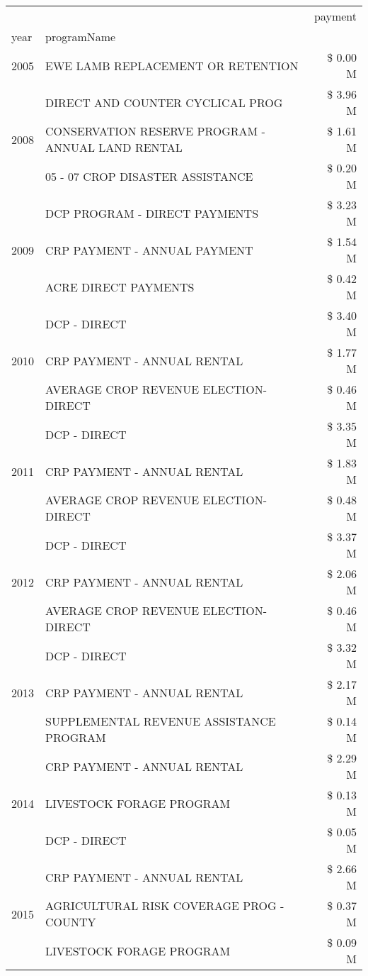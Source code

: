 \begin{tabular}{llr}
\toprule
 &  & payment \\
year & programName &  \\
\midrule
2005 & EWE LAMB REPLACEMENT OR RETENTION & \$ 0.00 M \\
\cline{1-3}
\multirow[t]{3}{*}{2008} & DIRECT AND COUNTER CYCLICAL PROG & \$ 3.96 M \\
 & CONSERVATION RESERVE PROGRAM - ANNUAL LAND RENTAL & \$ 1.61 M \\
 & 05 - 07 CROP DISASTER ASSISTANCE & \$ 0.20 M \\
\cline{1-3}
\multirow[t]{3}{*}{2009} & DCP PROGRAM - DIRECT PAYMENTS & \$ 3.23 M \\
 & CRP PAYMENT - ANNUAL PAYMENT & \$ 1.54 M \\
 & ACRE DIRECT PAYMENTS & \$ 0.42 M \\
\cline{1-3}
\multirow[t]{3}{*}{2010} & DCP - DIRECT & \$ 3.40 M \\
 & CRP PAYMENT - ANNUAL RENTAL & \$ 1.77 M \\
 & AVERAGE CROP REVENUE ELECTION-DIRECT & \$ 0.46 M \\
\cline{1-3}
\multirow[t]{3}{*}{2011} & DCP - DIRECT & \$ 3.35 M \\
 & CRP PAYMENT - ANNUAL RENTAL & \$ 1.83 M \\
 & AVERAGE CROP REVENUE ELECTION-DIRECT & \$ 0.48 M \\
\cline{1-3}
\multirow[t]{3}{*}{2012} & DCP - DIRECT & \$ 3.37 M \\
 & CRP PAYMENT - ANNUAL RENTAL & \$ 2.06 M \\
 & AVERAGE CROP REVENUE ELECTION-DIRECT & \$ 0.46 M \\
\cline{1-3}
\multirow[t]{3}{*}{2013} & DCP - DIRECT & \$ 3.32 M \\
 & CRP PAYMENT - ANNUAL RENTAL & \$ 2.17 M \\
 & SUPPLEMENTAL REVENUE ASSISTANCE PROGRAM & \$ 0.14 M \\
\cline{1-3}
\multirow[t]{3}{*}{2014} & CRP PAYMENT - ANNUAL RENTAL & \$ 2.29 M \\
 & LIVESTOCK FORAGE PROGRAM & \$ 0.13 M \\
 & DCP - DIRECT & \$ 0.05 M \\
\cline{1-3}
\multirow[t]{3}{*}{2015} & CRP PAYMENT - ANNUAL RENTAL & \$ 2.66 M \\
 & AGRICULTURAL RISK COVERAGE PROG - COUNTY & \$ 0.37 M \\
 & LIVESTOCK FORAGE PROGRAM & \$ 0.09 M \\

\end{tabular}
